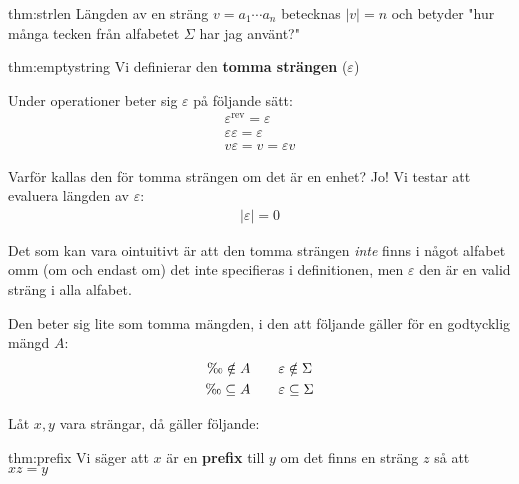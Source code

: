 \begin{theo}{thm:strlen}
  Längden av en sträng $v = a_1\cdots a_n$ betecknas $\left|v\right|=n$ och betyder "hur många tecken från alfabetet $\Sigma$ har jag använt?" 
\end{theo}
\par\bigskip
\begin{theo}{thm:emptystring}
  Vi definierar den \textbf{tomma strängen} ($\varepsilon$)\par
  \noindent Under operationer beter sig $\varepsilon$ på följande sätt:
  \begin{equation*}
    \begin{gathered}
      \varepsilon^{\text{rev}} = \varepsilon\\
      \varepsilon\varepsilon = \varepsilon\\
      v\varepsilon = v = \varepsilon v
    \end{gathered}
  \end{equation*}
  \par\bigskip
  \noindent Varför kallas den för tomma strängen om det är en enhet? Jo! Vi testar att evaluera längden av $\varepsilon$:
  \begin{equation*}
    \begin{gathered}
      \left|\varepsilon\right| = 0
    \end{gathered}
  \end{equation*}
\end{theo}
\par\bigskip
\noindent Det som kan vara ointuitivt är att den tomma strängen \textit{inte} finns i något alfabet omm (om och endast om) det inte specifieras i definitionen, men $\varepsilon$ den är en valid sträng i alla alfabet.\par
\noindent Den beter sig lite som tomma mängden, i den att följande gäller för en godtycklig mängd $A$:
\begin{equation*}
  \begin{gathered}
    \O\notin A\qquad\varepsilon\notin\Sigma\\
    \O\subseteq A\qquad\varepsilon\subseteq\Sigma
  \end{gathered}
\end{equation*}
\par\bigskip
\noindent Låt $x,y$ vara strängar, då gäller följande:
\par\bigskip
\begin{theo}[Prefix]{thm:prefix}
  Vi säger att $x$ är en \textbf{prefix} till $y$ om det finns en sträng $z$ så att $xz = y$
\end{theo}
